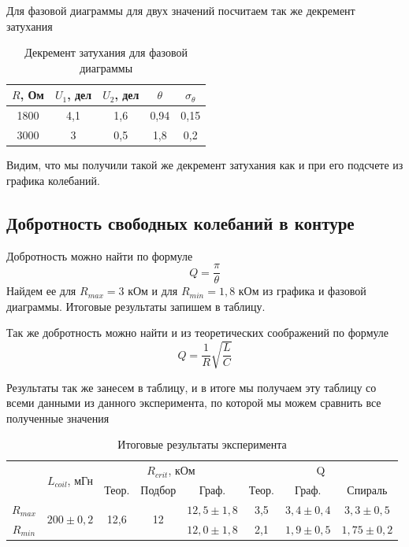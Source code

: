 \documentclass[a4paper, 12pt]{article}%
\begin{document}
Для фазовой диаграммы для двух значений посчитаем так же декремент затухания

\begin{table}[h!]
\begin{center}
\begin{tabular}{|c|c|c|c|c|}
\hline
$R$, Ом &$U_1$, дел & $U_2$, дел & $\theta$ & $\sigma_{\theta}$ \\ \hline
1800 &4,1        & 1,6        & 0,94    & 0,15              \\ \hline
3000& 3          & 0,5        & 1,8     & 0,2              \\ \hline
\end{tabular}
\caption{Декремент затухания для фазовой диаграммы}
\end{center}
\end{table}

Видим, что мы получили такой же декремент затухания как и при его подсчете из графика колебаний.
\subsection*{Добротность свободных колебаний в контуре}
Добротность можно найти по формуле 
\[Q = \dfrac{\pi}{\theta}\]
Найдем ее для $R_{max} = 3$ кОм и для $R_{min} = 1,8$ кОм из графика и фазовой диаграммы. Итоговые результаты запишем в таблицу.

Так же добротность можно найти и из теоретических соображений по формуле
\[Q = \dfrac{1}{R}\sqrt{\dfrac{L}{C}}\]

Результаты так же занесем в таблицу, и в итоге мы получаем эту таблицу со всеми данными из данного эксперимента, по которой мы можем сравнить все полученные значения

\begin{table}[h!]
\begin{center}
\begin{tabular}{|c|c|c|c|c|c|c|c|}
\hline
\multirow{2}{*}{} & \multirow{2}{*}{$L_{coil}$, мГн} & \multicolumn{3}{c|}{$R_{crit}$, кОм}                         & \multicolumn{3}{c|}{Q}                 \\ \cline{3-8} 
                  &                                  & Теор.                 & Подбор              & Граф.          & Теор. & Граф.         & Спираль        \\ \hline
$R_{max}$         & \multirow{2}{*}{$200 \pm 0,2$}   & \multirow{2}{*}{12,6} & \multirow{2}{*}{12} & $12,5 \pm 1,8$ & 3,5   & $3,4 \pm 0,4$ & $3,3 \pm 0,5$  \\ \cline{1-1} \cline{5-8} 
$R_{min}$         &                                  &                       &                     & $12,0 \pm 1,8$ & 2,1   & $1,9 \pm 0,5$ & $1,75 \pm 0,2$ \\ \hline
\end{tabular}
\caption{Итоговые результаты эксперимента}
\end{center}
\end{table}
\end{document}
